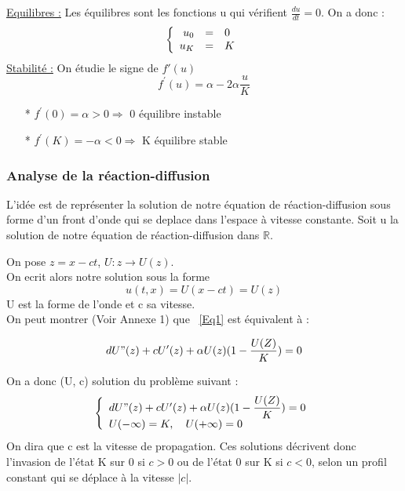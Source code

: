 \documentclass[a4paper,11pt]{article}
\begin{document}
\noindent\underline{Equilibres :} Les équilibres sont les fonctions u qui vérifient $\frac{du}{dt}=0$. On a donc :
\[
\left\{
\begin{array}{r c l}
u_0 &=& 0\\
u_K &=& K\\
\end{array}
\right.
\]
\underline{Stabilité :} On étudie le signe de $f'(u)$ 
$$f^\prime(u)= \alpha - 2 \alpha \dfrac{u}{K} $$

\begin{itemize}
    	\item[*] $f^\prime(0)=\alpha >0 \Rightarrow $ 0 équilibre instable
        \item[*] $f^\prime(K)= -\alpha <0 \Rightarrow $ K équilibre stable
	\end{itemize}


\subsubsection{Analyse de la réaction-diffusion}
\setcounter{equation}{0}
L'idée est de représenter la solution de notre équation de
réaction-diffusion sous forme d'un front d'onde qui se deplace dans l'espace à vitesse constante.
Soit u la solution de notre équation de réaction-diffusion dans $\mathbb{R}$.

\noindent On pose $z=x-ct$, $U:z\rightarrow U(z)$.\\

On ecrit alors notre solution sous la forme
\begin{equation}
u(t,x)=U(x-ct)=U(z)
\label{Eq1}
\end{equation}
U est la forme de l'onde et c sa vitesse.\\

\noindent On peut montrer (Voir Annexe 1) que ~\eqref{Eq1} est équivalent à :

\begin{equation*}
dU"(z)+c U'(z)+\alpha U(z)(1-\dfrac{U(Z)}{K})=0
\end{equation*} 

\noindent On a donc (U, c) solution du problème suivant :
\begin{equation} 
\left\{
\begin{array}{lcl}
dU"(z)+c U'(z)+\alpha U(z)(1-\dfrac{U(Z)}{K})=0 \\
U( - \infty )= K ,\quad U( + \infty )=0
\end{array}
\right.
\label{PbKPP }
\end{equation}
On dira que c est la vitesse de propagation. Ces solutions décrivent donc l'invasion de l'état K
sur 0 si $c > 0$ ou de l'état 0 sur K si $c< 0$, selon un profil constant qui se déplace à la vitesse
$|c|$.\\
\newline
\end{document}
